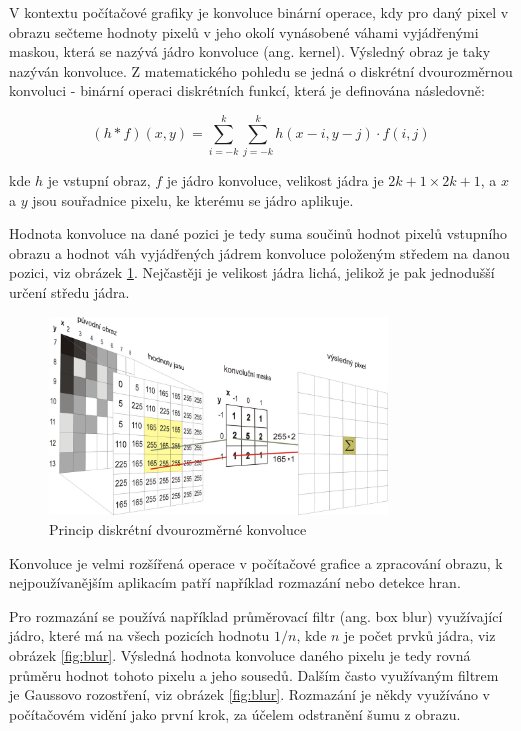 V kontextu počítačové grafiky je konvoluce binární operace, kdy pro daný pixel
v obrazu sečteme hodnoty pixelů v jeho okolí vynásobené váhami vyjádřenými
maskou, která se nazývá jádro konvoluce (ang. kernel). Výsledný obraz je taky
nazýván konvoluce. Z matematického pohledu se jedná o diskrétní dvourozměrnou
konvoluci - binární operaci diskrétních funkcí, která je definována následovně:

\begin{equation*}
    (h*f)(x,y)=\sum _{i=-k}^{k}\sum _{j=-k}^{k}h(x-i,y-j)\cdot f(i,j)
\end{equation*}

kde $h$ je vstupní obraz, $f$ je jádro konvoluce, velikost jádra je $2k+1
    \times 2k+1$, a $x$ a $y$ jsou souřadnice pixelu, ke kterému se jádro aplikuje.

Hodnota konvoluce na dané pozici je tedy suma součinů hodnot pixelů vstupního
obrazu a hodnot váh vyjádřených jádrem konvoluce položeným středem na danou
pozici, viz obrázek \ref{fig:convolution}. Nejčastěji je velikost jádra lichá,
jelikož je pak jednodušší určení středu jádra.

\begin{figure}[]
    \centering
    \includegraphics[width=0.8\textwidth]{Figures/convolution.jpg}
    \caption{Princip diskrétní dvourozměrné konvoluce \cite{convolution}}
    \label{fig:convolution}
\end{figure}

Konvoluce je velmi rozšířená operace v počítačové grafice a zpracování obrazu,
k nejpoužívanějším aplikacím patří například rozmazání nebo detekce hran.

Pro rozmazání se používá například průměrovací filtr (ang. box blur)
využívající jádro, které má na všech pozicích hodnotu $1/n$, kde $n$ je počet
prvků jádra, viz obrázek \ref{fig:blur}. Výsledná hodnota konvoluce daného
pixelu je tedy rovná průměru hodnot tohoto pixelu a jeho sousedů. Dalším často
využívaným filtrem je Gaussovo rozostření, viz obrázek \ref{fig:blur}.
Rozmazání je někdy využíváno v počítačovém vidění jako první krok, za účelem
odstranění šumu z obrazu.


